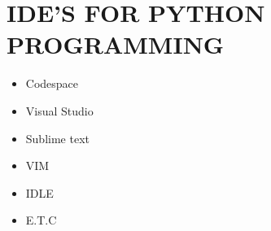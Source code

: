 \documentclass{article}
\begin{document}
	\section*{IDE'S FOR PYTHON PROGRAMMING}
	\begin{itemize}
		\item Codespace
		\item Visual Studio
		\item Sublime text
		\item VIM
		\item IDLE
		\item E.T.C
	\end{itemize}
\end{document}
